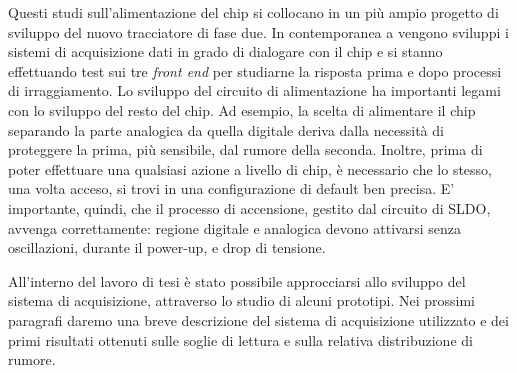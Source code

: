 Questi studi sull'alimentazione del chip si collocano in un più ampio progetto di sviluppo del nuovo tracciatore di fase due.
In contemporanea a vengono sviluppi i sistemi di acquisizione dati in grado di dialogare con il chip e si stanno effettuando test sui tre \textit{front end} per studiarne la risposta prima e dopo processi di irraggiamento. 
Lo sviluppo del circuito di alimentazione ha importanti legami con lo sviluppo del resto del chip.
Ad esempio, la scelta di alimentare il chip separando la parte analogica da quella digitale deriva dalla necessità di proteggere la prima, più sensibile, dal rumore della seconda.
Inoltre, prima di poter effettuare una qualsiasi azione a livello di chip, è necessario che lo stesso, una volta acceso, si trovi in una configurazione di default ben precisa.
E' importante, quindi, che il processo di accensione, gestito dal circuito di SLDO, avvenga correttamente: regione digitale e analogica devono attivarsi senza oscillazioni, durante il power-up, e drop di tensione. 

All'interno del lavoro di tesi è stato possibile approcciarsi allo sviluppo del sistema di acquisizione, attraverso lo studio di alcuni prototipi.
Nei prossimi paragrafi daremo una breve descrizione del sistema di acquisizione utilizzato e dei primi risultati ottenuti sulle soglie di lettura e sulla relativa distribuzione di rumore. 




